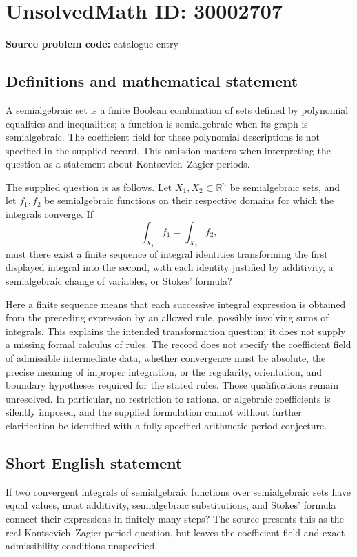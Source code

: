 \documentclass[11pt]{article}
\newcommand{\R}{\mathbb{R}}
\begin{document}
\section*{UnsolvedMath ID: 30002707}
\textbf{Source problem code:} catalogue entry
\subsection{Definitions and mathematical statement}
A semialgebraic set is a finite Boolean combination of sets defined by polynomial equalities and inequalities; a function is semialgebraic when its graph is semialgebraic. The coefficient field for these polynomial descriptions is not specified in the supplied record. This omission matters when interpreting the question as a statement about Kontsevich--Zagier periods.

The supplied question is as follows. Let \(X_1,X_2\subset\R^n\) be semialgebraic sets, and let \(f_1,f_2\) be semialgebraic functions on their respective domains for which the integrals converge. If
\[
\int_{X_1} f_1=\int_{X_2} f_2,
\]
must there exist a finite sequence of integral identities transforming the first displayed integral into the second, with each identity justified by additivity, a semialgebraic change of variables, or Stokes' formula?

Here a finite sequence means that each successive integral expression is obtained from the preceding expression by an allowed rule, possibly involving sums of integrals. This explains the intended transformation question; it does not supply a missing formal calculus of rules. The record does not specify the coefficient field of admissible intermediate data, whether convergence must be absolute, the precise meaning of improper integration, or the regularity, orientation, and boundary hypotheses required for the stated rules. Those qualifications remain unresolved. In particular, no restriction to rational or algebraic coefficients is silently imposed, and the supplied formulation cannot without further clarification be identified with a fully specified arithmetic period conjecture.
\subsection{Short English statement}
If two convergent integrals of semialgebraic functions over semialgebraic sets have equal values, must additivity, semialgebraic substitutions, and Stokes' formula connect their expressions in finitely many steps? The source presents this as the real Kontsevich--Zagier period question, but leaves the coefficient field and exact admissibility conditions unspecified.
\end{document}
